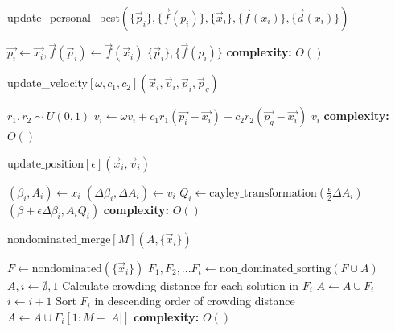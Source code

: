 \begin{algorithm}[H]
\caption{update\_personal\_best$(\{\vec{p}_i\}, \{\vec{f}(p_i)\},\{\vec{x}_i\}, \{\vec{f}(x_i)\}, \{\vec{d}(x_i)\})$}
\label{alg:mopso}
\begin{algorithmic}[1]
\State $\vec{p_i} \gets \vec{x_i}, \vec{f}(\vec{p}_i) \gets \vec{f}(\vec{x}_i)$
\EndIf
\EndFor
\State \Return $\{\vec{p}_i\}, \{\vec{f}(p_i)\} $
\State \textbf{complexity: } $O()$
\end{algorithmic}
\end{algorithm}

\begin{algorithm}[H]
\caption{update\_velocity$[\omega,c_1, c_2](\vec{x}_i,\vec{v}_i,\vec{p}_i,\vec{p}_g)$}
\label{alg:update_vel}
\begin{algorithmic}[1]
\State $r_1, r_2 \sim U(0,1)$
\State $v_i \gets \omega v_i + c_1 r_1 (\vec{p_i} - \vec{x_i}) + c_2 r_2 (\vec{p_g} - \vec{x_i})$
\State \Return $v_i$
\State \textbf{complexity: } $O()$
\end{algorithmic}
\end{algorithm}

\begin{algorithm}[H]
\caption{$\text{update\_position}[\epsilon](\vec{x}_i,\vec{v}_i)$}
\label{update_pos}
\begin{algorithmic}[1]
\State $(\beta_i,A_i) \gets x_i$
\State $(\Delta \beta_i,\Delta A_i) \gets v_i$
\State $Q_i \gets \text{cayley\_transformation}(\frac{\epsilon}{2}\Delta A_i)$
\State \Return $(\beta+\epsilon \Delta \beta_i,A_iQ_i)$
\State \textbf{complexity: } $O()$
\end{algorithmic}
\end{algorithm}

\begin{algorithm}[H]
\caption{$\text{nondominated\_merge}[M](A, \{\vec{x}_i\})$}
\label{mopso_non_dominated_merge}
\begin{algorithmic}[1]
\State $F \gets \text{nondominated}(\{\vec{x}_i\})$
\State $F_1,F_2,...F_t \gets \text{non\_dominated\_sorting}(F\cup A)$
\State $A , i \gets \emptyset, 1 $
\State Calculate crowding distance for each solution in $F_i$
\State $A \gets A \cup F_i$
\State $i \gets i+1$
\EndWhile
{}
\State Sort $F_i$ in descending order of crowding distance
\State $A \gets A \cup F_i[1:M-|A|]$ 
\EndIf 
\State \textbf{complexity: } $O()$
\end{algorithmic}
\end{algorithm}

